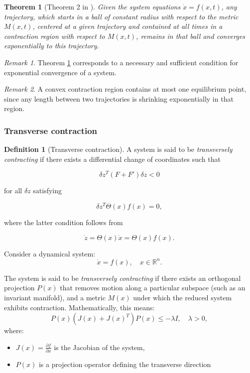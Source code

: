\documentclass{article}
\newtheorem{theorem}{Theorem}
\theoremstyle{definition} \newtheorem{definition}{Definition}
\theoremstyle{remark} \newtheorem{remark}{Remark}
\newcounter{ct}
\begin{document}
\begin{theorem}[Theorem 2 in \citep{lohmiller1998contraction}]\label{thrm:contractive}
Given the system equations $\dot x = f(x,t)$, any trajectory, which starts in a ball of constant radius with respect to the metric $M(x,t)$, centered at a given trajectory and contained at all times in a contraction region with respect to $M(x,t)$,  remains in that ball and converges exponentially to this trajectory.
\end{theorem}

\begin{remark}
Theorem \ref{thrm:contractive} corresponds to a necessary and sufficient condition for exponential convergence of a system. 
\end{remark}

\begin{remark}
A convex contraction region contains at most one equilibrium point, since any length between two trajectories is shrinking exponentially in that region.
\end{remark}

\subsubsection{Transverse contraction}
\begin{definition}[Transverse contraction] 
A system is said to be \textit{transversely contracting} if there exists a differential change of coordinates such that  

\[
\delta z^T (F + F') \delta z < 0
\]

for all \( \delta z \) satisfying  

\[
\delta z^T \Theta(x) f(x) = 0,
\]

where the latter condition follows from  

\[
\dot{z} = \Theta(x) \dot{x} = \Theta(x) f(x).
\]

\end{definition}

Consider a dynamical system:
\begin{equation}
    \dot{x} = f(x), \quad x \in \mathbb{R}^n.
\end{equation}

The system is said to be \textit{transversely contracting} if there exists an orthogonal projection $P(x)$ that removes motion along a particular subspace (such as an invariant manifold), and a metric $M(x)$ under which the reduced system exhibits contraction. Mathematically, this means:
\begin{equation}
    P(x) (J(x) + J(x)^T) P(x) \leq -\lambda I, \quad \lambda > 0,
\end{equation}
where:
\begin{itemize}
    \item $J(x) = \frac{\partial f}{\partial x}$ is the Jacobian of the system,
    \item $P(x)$ is a projection operator defining the transverse direction
\end{itemize}
\end{document}
